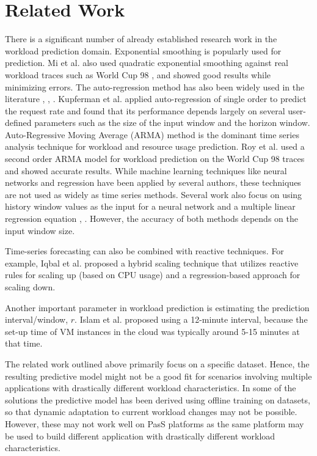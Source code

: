\section{Related Work}

There is a significant number of already established research work in the workload prediction domain. Exponential smoothing is popularly used for prediction. Mi et al. \cite{Mi_2010} also used quadratic exponential smoothing against real workload traces such as World Cup 98 \cite{WorldCup_1998}, and showed good results while minimizing errors. The auto-regression method has also been widely used in the literature \cite{Kupferman_2009}, \cite{Khatua_2010}, \cite{Zhenhuan_Gong_2010}. Kupferman et al. \cite{Kupferman_2009} applied auto-regression of single order to predict the request rate and found that its performance depends largely on several user-defined parameters such as the size of the input window and the horizon window. Auto-Regressive Moving Average (ARMA) method is the dominant time series analysis technique for workload and resource usage prediction. Roy et al. \cite{Roy_2011} used a second order ARMA model for workload prediction on the World Cup 98 traces and showed accurate results. While machine learning techniques like neural networks and regression have been applied by several authors, these techniques are not used as widely as time series methods. Several work also focus on using history window values as the input for a neural network \cite{Islam_2012} and a multiple linear regression equation \cite{Kupferman_2009}, \cite{Islam_2012}. However, the accuracy of both methods depends on the input window size.

Time-series forecasting can also be combined with reactive techniques. For example, Iqbal et al. \cite{Iqbal_2011} proposed a hybrid scaling technique that utilizes reactive rules for scaling up (based on CPU usage) and a regression-based approach for scaling down.

Another important parameter in workload prediction is estimating the prediction interval/window, $r$. Islam et al. \cite{Islam_2012} proposed using a 12-minute interval, because the set-up time of VM instances in the cloud was typically around 5-15 minutes at that time.

The related work outlined above primarily focus on a specific dataset. Hence, the resulting predictive model might not be a good fit for scenarios involving multiple applications with drastically different workload characteristics. In some of the solutions the predictive model has been derived using offline training on datasets, so that dynamic adaptation to current workload changes may not be possible. However, these may not work well on PasS platforms as the same platform may be used to build different application with drastically different workload characteristics.

